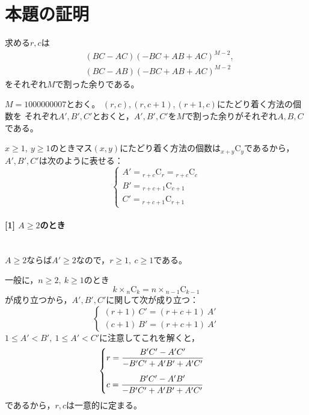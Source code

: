 \documentclass{article}
\makeatletter
\renewenvironment{proof}[1][\proofname]{\par
    \pushQED{\qed}
    \normalfont
    \topsep6\p@\@plus6\p@ \trivlist
    \item[\hskip\labelsep{\bfseries #1}\@addpunct{\bfseries}]\ignorespaces
}{%
    \popQED\endtrivlist\@endpefalse
}
\renewcommand{\proofname}{証明.}
\newcommand{\myparagraph}[1]{\paragraph{#1}\mbox{}\\}
\newcommand{\combination}[2]{{}_{#1} \mathrm{C}_{#2}}
\makeatother
\begin{document}
\section{本題の証明}

\begin{screen}
    求める$r, c$は
    \begin{eqnarray*}
        &(BC - AC)(-BC + AB + AC)^{M - 2}, \\
        &(BC - AB)(-BC + AB + AC)^{M - 2}
    \end{eqnarray*}
    をそれぞれ$M$で割った余りである。
\end{screen}

\begin{proof}
    $M = 1000000007$とおく。
    $(r, c), (r, c + 1), (r + 1, c)$にたどり着く方法の個数を
    それぞれ$A', B', C'$とおくと，$A', B', C'$を$M$で割った余りがそれぞれ$A, B, C$である。

    $x \geq 1,\ y \geq 1$のときマス$(x, y)$にたどり着く方法の個数は$\combination{x + y}{y}$であるから，
    $A', B', C'$は次のように表せる：
    \begin{equation*}
        \begin{cases}
            A' = \combination{r + c}{r} = \combination{r + c}{c} \\
            B' = \combination{r + c + 1}{c + 1} \\
            C' = \combination{r + c + 1}{r + 1}
        \end{cases}
    \end{equation*}

    \myparagraph{[1] $A \geq 2$のとき}

    $A \geq 2$ならば$A' \geq 2$なので，$r \geq 1,\ c \geq 1$である。

    一般に，$n \geq 2,\ k \geq 1$のとき
    \begin{equation*}
        k \times \combination{n}{k} = n \times \combination{n - 1}{k - 1}
    \end{equation*}
    が成り立つから，$A', B', C'$に関して次が成り立つ：
    \begin{equation*}
        \begin{cases}
            (r + 1)\ C' = (r + c + 1)\ A' \\
            (c + 1)\ B' = (r + c + 1)\ A'
        \end{cases}
    \end{equation*}
    $1 \leq A' < B',\ 1 \leq A' < C'$に注意してこれを解くと，
    \begin{equation}
        \label{r_c}
        \begin{cases}
            \vspace{10pt}
            r = \dfrac{B'C' - A'C'}{-B'C' + A'B' + A'C'} \\
            c = \dfrac{B'C' - A'B'}{-B'C' + A'B' + A'C'}
        \end{cases}
    \end{equation}
    であるから，$r, c$は一意的に定まる。


\end{proof}
\end{document}

